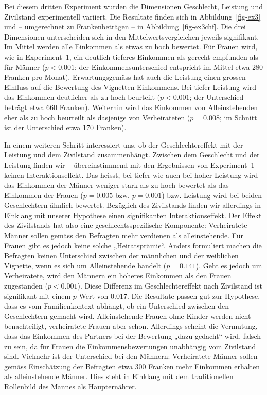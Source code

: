 \documentclass[a4paper,12pt]{article}
\begin{document}
Bei diesem dritten Experiment wurden die Dimensionen Geschlecht, Leistung und
Zivilstand experimentell variiert. Die Resultate finden sich in Abbildung~\ref{fig-ex3} und –
umgerechnet zu Frankenbeträgen – in Abbildung~\ref{fig-ex3chf}. Die drei Dimensionen unterscheiden sich in den Mittelwertsvergleichen jeweils signifikant. Im Mittel werden alle Einkommen als etwas zu hoch bewertet. Für
Frauen wird, wie in Experiment~1, ein deutlich tieferes Einkommen als gerecht
empfunden als für Männer ($p<0.001$; der Einkommensunterschied entspricht im
Mittel etwa 280 Franken pro Monat). Erwartungsgemäss hat auch die Leistung
einen grossen Einfluss auf die Bewertung des Vignetten-Einkommens. Bei tiefer
Leistung wird das Einkommen deutlicher als zu hoch beurteilt ($p<0.001$; der
Unterschied beträgt etwa 660 Franken). Weiterhin wird das Einkommen von
Alleinstehenden eher als zu hoch beurteilt als dasjenige von Verheirateten
($p=0.008$; im Schnitt ist der Unterschied etwa 170 Franken).

In einem weiteren Schritt interessiert uns, ob der Geschlechtereffekt mit der
Leistung und dem Zivilstand zusammenhängt. Zwischen dem Geschlecht und der
Leistung finden wir -- übereinstimmend mit den Ergebnissen von Experiment~1 --
keinen Interaktionseffekt. Das heisst, bei tiefer wie auch bei hoher Leistung
wird das Einkommen der Männer weniger stark als zu hoch bewertet als das
Einkommen der Frauen ($p=0.005$ bzw. $p=0.001$) bzw. Leistung wird bei beiden
Geschlechtern ähnlich bewertet. Bezüglich des Zivilstands finden wir allerdings
in Einklang mit unserer Hypothese einen signifikanten Interaktionseffekt. Der
Effekt des Zivilstands hat also eine geschlechtsspezifische Komponente:
Verheiratete Männer sollen gemäss den Befragten mehr verdienen als
alleinstehende. Für Frauen gibt es jedoch keine solche „Heiratsprämie“. Anders
formuliert machen die Befragten keinen Unterschied zwischen der männlichen und
der weiblichen Vignette, wenn es sich um Alleinstehende handelt ($p=0.141$).
Geht es jedoch um Verheiratete, wird den Männern ein höheres Einkommen als den
Frauen zugestanden ($p<0.001$). Diese Differenz im Geschlechtereffekt nach
Zivilstand ist signifikant mit einem $p$-Wert von 0.017. Die Resultate passen
gut zur Hypothese, dass es vom Familienkontext abhängt, ob ein Unterschied
zwischen den Geschlechtern gemacht wird. Alleinstehende Frauen ohne Kinder
werden nicht benachteiligt, verheiratete Frauen aber schon. Allerdings scheint
die Vermutung, dass das Einkommen des Partners bei der Bewertung „dazu gedacht“
wird, falsch zu sein, da für Frauen die Einkommensbewertungen unabhängig vom
Zivilstand sind. Vielmehr ist der Unterschied bei den Männern: Verheiratete
Männer sollen gemäss Einschätzung der Befragten etwa 300 Franken mehr Einkommen
erhalten als alleinstehende Männer. Dies steht in Einklang mit dem
traditionellen Rollenbild des Mannes als Haupternährer.
\end{document}
